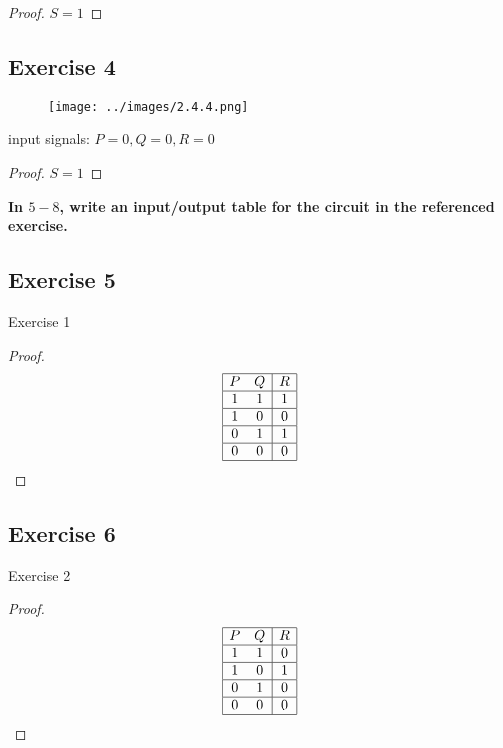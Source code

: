 \documentclass[14pt]{extarticle}
\begin{document}
\begin{proof}
    $S = 1$
\end{proof}

\subsection{Exercise 4}
\begin{figure}[ht!]
    \centering
    \texttt{[image: ../images/2.4.4.png]}
\end{figure}
input signals: $P= 0, Q = 0, R = 0$

\begin{proof}
    $S = 1$
\end{proof}

{\bf \color{cyan} In $5-8$, write an input/output table for the circuit in the referenced exercise.}

\subsection{Exercise 5}
Exercise 1

\begin{proof}
    $$
        \begin{array}{|cc|c|}
            \hline
            P & Q & R \\
            \hline
            1 & 1 & 1 \\
            \hline
            1 & 0 & 0 \\
            \hline
            0 & 1 & 1 \\
            \hline
            0 & 0 & 0 \\
            \hline
        \end{array}
    $$
\end{proof}

\subsection{Exercise 6}
Exercise 2

\begin{proof}
    $$
        \begin{array}{|cc|c|}
            \hline
            P & Q & R \\
            \hline
            1 & 1 & 0 \\
            \hline
            1 & 0 & 1 \\
            \hline
            0 & 1 & 0 \\
            \hline
            0 & 0 & 0 \\
            \hline
        \end{array}
    $$
\end{proof}
\end{document}
